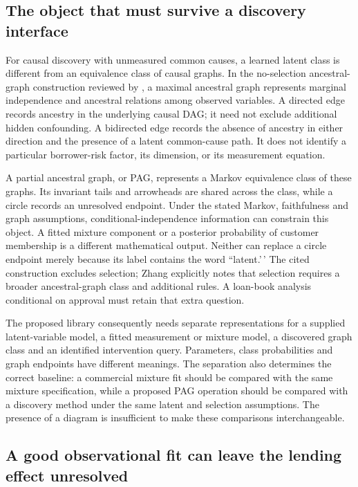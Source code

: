 \hypertarget{the-object-that-must-survive-a-discovery-interface}{%
\subsection{The object that must survive a discovery
interface}\label{the-object-that-must-survive-a-discovery-interface}}

For causal discovery with unmeasured common causes, a learned latent
class is different from an equivalence class of causal graphs. In the
no-selection ancestral-graph construction reviewed by
\citet[Section 3]{zhang2008}, a maximal ancestral graph represents
marginal independence and ancestral relations among observed variables.
A directed edge records ancestry in the underlying causal DAG; it need
not exclude additional hidden confounding. A bidirected edge records the
absence of ancestry in either direction and the presence of a latent
common-cause path. It does not identify a particular borrower-risk
factor, its dimension, or its measurement equation.

A partial ancestral graph, or PAG, represents a Markov equivalence class
of these graphs. Its invariant tails and arrowheads are shared across
the class, while a circle records an unresolved endpoint. Under the
stated Markov, faithfulness and graph assumptions,
conditional-independence information can constrain this object. A fitted
mixture component or a posterior probability of customer membership is a
different mathematical output. Neither can replace a circle endpoint
merely because its label contains the word ``latent.'\,' The cited
construction excludes selection; Zhang explicitly notes that selection
requires a broader ancestral-graph class and additional rules. A
loan-book analysis conditional on approval must retain that extra
question. \citep[pp.1442--1445]{zhang2008}

The proposed library consequently needs separate representations for a
supplied latent-variable model, a fitted measurement or mixture model, a
discovered graph class and an identified intervention query. Parameters,
class probabilities and graph endpoints have different meanings. The
separation also determines the correct baseline: a commercial mixture
fit should be compared with the same mixture specification, while a
proposed PAG operation should be compared with a discovery method under
the same latent and selection assumptions. The presence of a diagram is
insufficient to make these comparisons interchangeable.

\hypertarget{a-good-observational-fit-can-leave-the-lending-effect-unresolved}{%
\subsection{A good observational fit can leave the lending effect
unresolved}\label{a-good-observational-fit-can-leave-the-lending-effect-unresolved}}

